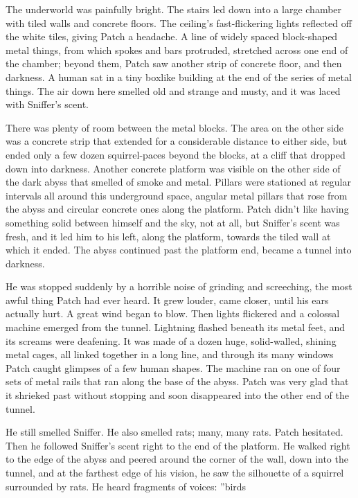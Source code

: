 \documentclass[12pt]{book}
\begin{document}
 The underworld was painfully bright. The stairs led down into a large chamber with tiled walls and concrete floors. The ceiling's fast-flickering lights reflected off the white tiles, giving Patch a headache. A line of widely spaced block-shaped metal things, from which spokes and bars protruded, stretched across one end of the chamber; beyond them, Patch saw another strip of concrete floor, and then darkness. A human sat in a tiny boxlike building at the end of the series of metal things. The air down here smelled old and strange and musty, and it was laced with Sniffer's scent.\par
 There was plenty of room between the metal blocks. The area on the other side was a concrete strip that extended for a considerable distance to either side, but ended only a few dozen squirrel-paces beyond the blocks, at a cliff that dropped down into darkness. Another concrete platform was visible on the other side of the dark abyss that smelled of smoke and metal. Pillars were stationed at regular intervals all around this underground space, angular metal pillars that rose from the abyss and circular concrete ones along the platform. Patch didn't like having something solid between himself and the sky, not at all, but Sniffer's scent was fresh, and it led him to his left, along the platform, towards the tiled wall at which it ended. The abyss continued past the platform end, became a tunnel into darkness.\par
 He was stopped suddenly by a horrible noise of grinding and screeching, the most awful thing Patch had ever heard. It grew louder, came closer, until his ears actually hurt. A great wind began to blow. Then lights flickered and a colossal machine emerged from the tunnel. Lightning flashed beneath its metal feet, and its screams were deafening. It was made of a dozen huge, solid-walled, shining metal cages, all linked together in a long line, and through its many windows Patch caught glimpses of a few human shapes. The machine ran on one of four sets of metal rails that ran along the base of the abyss. Patch was very glad that it shrieked past without stopping and soon disappeared into the other end of the tunnel.\par
 He still smelled Sniffer. He also smelled rats; many, many rats. Patch hesitated. Then he followed Sniffer's scent right to the end of the platform. He walked right to the edge of the abyss and peered around the corner of the wall, down into the tunnel, and at the farthest edge of his vision, he saw the silhouette of a squirrel surrounded by rats. He heard fragments of voices: ''birds%
\end{document}
